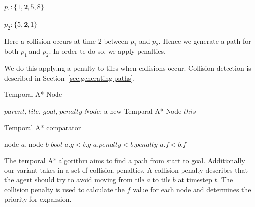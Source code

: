 \documentclass[a4paper,11pt]{article}
\let\oldReturn\Return
\renewcommand{\Return}{\State\oldReturn}
\begin{document}
\begin{compactitem}
	\item $p_1 : \{1, \textbf{2}, 5, 8\}$
	\item $p_2 : \{5, \textbf{2}, 1\}$
\end{compactitem}

Here a collision occurs at time 2 between $p_1$ and $p_2$. Hence we generate a path for both $p_1$ and $p_2$. In order to do so, we apply penalties. 


We do this applying a penalty to tiles when collisions occur. Collision detection is described in Section~\ref{sec:generating-paths}.

\begin{algorithm}
	\caption{Temporal A* Node} \label{alg:temporalastar-node}
	\begin{algorithmic}[1]
		\Require $parent$, $tile$, $goal$, $penalty$
		\Ensure $Node$: a new Temporal A* Node
		\Else
		\EndIf
		\Return $this$
	\end{algorithmic}
\end{algorithm}

\begin{algorithm}
	\caption{Temporal A* comparator} \label{alg:temporalastarheur}
	\begin{algorithmic}[1]
		\Require node $a$, node $b$
		\Ensure $bool$
		\Return $a.g < b.g$
		\Else
		\Return $a.penalty < b.penalty$
		\EndIf
		\Else
		\Return $a.f < b.f$
		\EndIf
	\end{algorithmic}
\end{algorithm}

The temporal A* algorithm aims to find a path from start to goal. Additionally our variant takes in a set of collision penalties. A collision penalty describes that the agent should try to avoid moving from tile $a$ to tile $b$ at timestep $t$. The collision penalty is used to calculate the $f$ value for each node and determines the priority for expansion.
\end{document}
